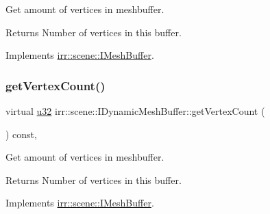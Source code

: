Get amount of vertices in meshbuffer. 

\begin{DoxyReturn}{Returns}
Number of vertices in this buffer. 
\end{DoxyReturn}


Implements \hyperlink{classirr_1_1scene_1_1IMeshBuffer_a77ab285c8c886af8ddeb0371db7bde96}{irr\+::scene\+::\+I\+Mesh\+Buffer}.

\mbox{\label{classirr_1_1scene_1_1IDynamicMeshBuffer_afc317a8ccda7e7eceb1f4955c90848d2}} 
\subsubsection{\texorpdfstring{get\+Vertex\+Count()}{getVertexCount()}\hspace{0.1cm}{\footnotesize\ttfamily [2/2]}}
{\footnotesize\ttfamily virtual \hyperlink{namespaceirr_a0416a53257075833e7002efd0a18e804}{u32} irr\+::scene\+::\+I\+Dynamic\+Mesh\+Buffer\+::get\+Vertex\+Count (\begin{DoxyParamCaption}{ }\end{DoxyParamCaption}) const\hspace{0.3cm}{\ttfamily [inline]}, {\ttfamily [virtual]}}



Get amount of vertices in meshbuffer. 

\begin{DoxyReturn}{Returns}
Number of vertices in this buffer. 
\end{DoxyReturn}


Implements \hyperlink{classirr_1_1scene_1_1IMeshBuffer_a77ab285c8c886af8ddeb0371db7bde96}{irr\+::scene\+::\+I\+Mesh\+Buffer}.

\mbox{\label{classirr_1_1scene_1_1IDynamicMeshBuffer_a3e7523774efaf9a177de6396dfdc14e2}} 
